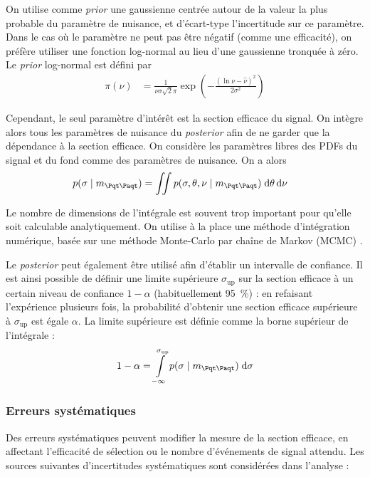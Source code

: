 On utilise comme \emph{prior} une gaussienne centrée autour de la valeur la plus probable du paramètre de nuisance, et d'écart-type l'incertitude sur ce paramètre. Dans le cas où le paramètre ne peut pas être négatif (comme une efficacité), on préfère utiliser une fonction log-normal au lieu d'une gaussienne tronquée à zéro. Le \emph{prior} log-normal est défini par
\begin{align*}
  \pi(\nu) &= \frac{1}{\nu \sigma \sqrt{2} \pi} \exp{\left( - \frac{\left( \ln\nu - \hat{\nu}\right)^2}{2 \sigma^2} \right)}
\end{align*}

Cependant, le seul paramètre d'intérêt est la section efficace du signal. On intègre alors tous les paramètres de nuisance du \emph{posterior} afin de ne garder que la dépendance à la section efficace. On considère les paramètres libres des PDFs du signal et du fond comme des paramètres de nuisance. On a alors
\begin{align*}
  p(\sigma \mid \mtt) &= \iint{ p(\sigma, \theta, \nu \mid \mtt) \; \mathrm{d\theta} \, \mathrm{d} \nu }
\end{align*}

Le nombre de dimensions de l'intégrale est souvent trop important pour qu'elle soit calculable analytiquement. On utilise à la place une méthode d'intégration numérique, basée sur une méthode Monte-Carlo par chaîne de Markov (MCMC) \citep{metropolis,hastings70}.

\smallskip

Le \emph{posterior} peut également être utilisé afin d'établir un intervalle de confiance. Il est ainsi possible de définir une limite supérieure $\sigma_\text{up}$ sur la section efficace à un certain niveau de confiance $1 - \alpha$ (habituellement \SI{95}{\percent}) : en refaisant l'expérience plusieurs fois, la probabilité d'obtenir une section efficace supérieure à $\sigma_\text{up}$ est égale $ \alpha$.
La limite supérieure est définie comme la borne supérieur de l'intégrale :
\begin{align*}
  1 - \alpha = \int \limits_{-\infty}^{\sigma_{\text{up}}} p(\sigma \mid \mtt) \; \mathrm{d} \sigma
\end{align*}

\subsubsection{Erreurs systématiques}

Des erreurs systématiques peuvent modifier la mesure de la section efficace, en affectant l'efficacité de sélection ou le nombre d'événements de signal attendu. Les sources suivantes d'incertitudes systématiques sont considérées dans l'analyse :

